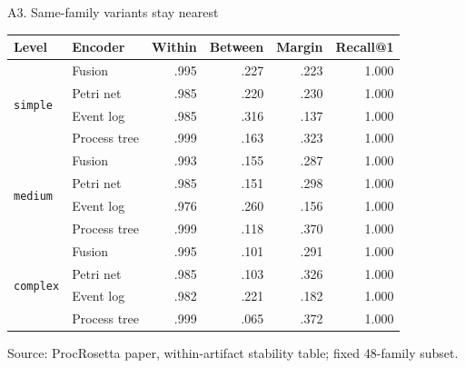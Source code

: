 \documentclass[aspectratio=169,12pt]{beamer}
\newcommand{\source}[1]{\vfill{\tiny\color{prgray}Source: #1\par}}
\begin{document}
\begin{frame}[t]{A3. Same-family variants stay nearest}
  \vspace{2mm}
  \centering
  \scriptsize
  \renewcommand{\arraystretch}{1.03}
  \setlength{\tabcolsep}{4.2pt}
  \begin{tabular}{@{}llrrrr@{}}
    \toprule
    Level & Encoder & Within & Between & Margin & Recall@1 \\
    \midrule
    \multirow{4}{*}{\texttt{simple}} & Fusion & .995 & .227 & .223 & 1.000 \\
      & Petri net & .985 & .220 & .230 & 1.000 \\
      & Event log & .985 & .316 & .137 & 1.000 \\
      & Process tree & .999 & .163 & .323 & 1.000 \\
    \midrule
    \multirow{4}{*}{\texttt{medium}} & Fusion & .993 & .155 & .287 & 1.000 \\
      & Petri net & .985 & .151 & .298 & 1.000 \\
      & Event log & .976 & .260 & .156 & 1.000 \\
      & Process tree & .999 & .118 & .370 & 1.000 \\
    \midrule
    \multirow{4}{*}{\texttt{complex}} & Fusion & .995 & .101 & .291 & 1.000 \\
      & Petri net & .985 & .103 & .326 & 1.000 \\
      & Event log & .982 & .221 & .182 & 1.000 \\
      & Process tree & .999 & .065 & .372 & 1.000 \\
    \bottomrule
  \end{tabular}
  \source{ProcRosetta paper, within-artifact stability table; fixed 48-family subset.}
\end{frame}
\end{document}
